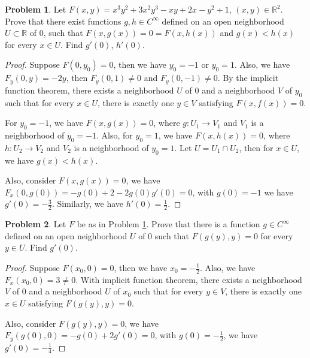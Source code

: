 \documentclass[11pt]{article}
\theoremstyle{definition}
\newtheorem{problem}{Problem}
\theoremstyle{definition}
\begin{document}
\medskip

\begin{problem}\label{problem_64}
Let $F(x,y)=x^3y^2+3x^2y^3-xy+2x-y^2+1$, $(x,y)\in\mathbb{R}^2$. Prove that there exist functions $g,h\in C^\infty$ defined on an open neighborhood
$U\subset\mathbb{R}$ of $0$, such that $F(x,g(x))=0=F(x,h(x))$ and $g(x)<h(x)$ for every $x\in U$. Find $g'(0)$, $h'(0)$.
\end{problem}
\begin{proof}
Suppose $F(0,y_0) = 0$, then we have $y_0 = -1$ or $y_0 = 1$. Also, we have $F_y(0,y) = -2y$, then $F_y(0,1) \neq 0$ and $F_y(0,-1) \neq 0$. By the implicit function theorem, there exists a neighborhood $U$ of $0$ and a neighborhood $V$ of $y_0$ such that for every $x\in U$, there is exactly one $y\in V$ satisfying $F(x, f(x)) = 0$. 

For $y_0 = -1$, we have $F(x, g(x)) = 0$, where $g:U_1 \to V_1$ and $V_1$ is a neighborhood of $y_0 = -1$. Also, for $y_0 = 1$, we have $F(x, h(x)) = 0$, where $h:U_2 \to V_2$ and $V_2$ is a neighborhood of $y_0 = 1$. Let $U = U_1 \cap U_2$, then for $x \in U$, we have $g(x) < h(x)$. 

Also, consider $F(x, g(x)) = 0$, we have $F_x(0,g(0)) = - g(0) + 2 - 2g(0) g'(0) = 0$, with $g(0) = -1$ we have $g'(0) = -\frac{3}{2}$. Similarly, we have $h'(0) = \frac{1}{2}$.
\end{proof}

\medskip

\begin{problem}
Let $F$ be as in Problem \ref{problem_64}. Prove that there is a function $g\in C^\infty$ defined on an open neighborhood $U$ of $0$ such that $F(g(y),y) = 0$ for every $y \in U$. Find $g'(0)$.
\end{problem}
\begin{proof}
Suppose $F(x_0, 0) = 0$, then we have $x_0 = -\frac{1}{2}$. Also, we have $F_x(x_0, 0) = 3 \neq 0$. With implicit function theorem, there exists a neighborhood $V$ of $0$ and a neighborhood $U$ of $x_0$ such that for every $y\in V$, there is exactly one $x\in U$ satisfying $F(g(y), y) = 0$.

Also, consider $F(g(y), y) = 0$, we have $F_y(g(0), 0) = - g(0) + 2 g'(0) = 0$, with $g(0) = -\frac{1}{2}$, we have $g'(0) = -\frac{1}{4}$.
\end{proof}

\medskip
\end{document}
